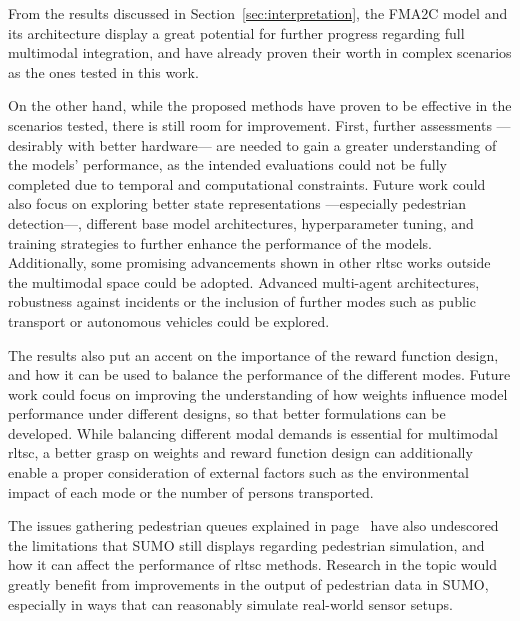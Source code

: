 From the results discussed in Section~\ref{sec:interpretation}, the FMA2C model and its architecture display a great potential for further progress regarding full multimodal integration, and have already proven their worth in complex scenarios as the ones tested in this work.

On the other hand, while the proposed methods have proven to be effective in the scenarios tested, there is still room for improvement. First, further assessments —desirably with better hardware— are needed to gain a greater understanding of the models' performance, as the intended evaluations could not be fully completed due to temporal and computational constraints. Future work could also focus on exploring better state representations —especially pedestrian detection—, different base model architectures, hyperparameter tuning, and training strategies to further enhance the performance of the models. Additionally, some promising advancements shown in other \gls{rltsc} works outside the multimodal space could be adopted. Advanced multi-agent architectures, robustness against incidents or the inclusion of further modes such as public transport or autonomous vehicles could be explored.

The results also put an accent on the importance of the reward function design, and how it can be used to balance the performance of the different modes. Future work could focus on improving the understanding of how weights influence model performance under different designs, so that better formulations can be developed. While balancing different modal demands is essential for multimodal \gls{rltsc}, a better grasp on weights and reward function design can additionally enable a proper consideration of external factors such as the environmental impact of each mode or the number of persons transported.

The issues gathering pedestrian queues explained in page~\pageref{par:putosumo} have also undescored the limitations that SUMO still displays regarding pedestrian simulation, and how it can affect the performance of \gls{rltsc} methods. Research in the topic would greatly benefit from improvements in the output of pedestrian data in SUMO, especially in ways that can reasonably simulate real-world sensor setups.